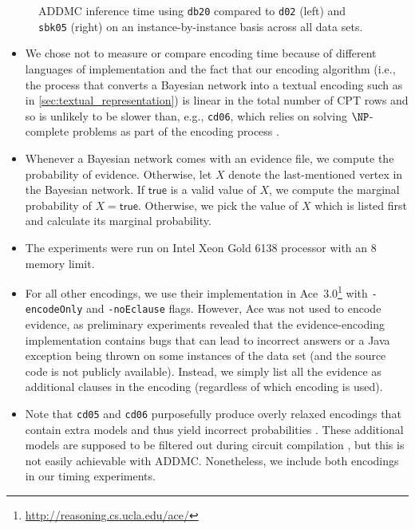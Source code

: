 \documentclass{article}
\theoremstyle{definition}
\theoremstyle{remark}
\begin{document}
{\begin{figure}
  \centering
  \caption{ADDMC inference time using \texttt{db20} compared to \texttt{d02}
    (left) and \texttt{sbk05} (right) on an instance-by-instance basis across
    all data sets.}
\end{figure}

\begin{itemize}
\item We chose not to measure or compare encoding time because of different
  languages of implementation and the fact that our encoding algorithm (i.e.,
  the process that converts a Bayesian network into a textual encoding such as
  in \cref{sec:textual_representation}) is linear in the total number of CPT
  rows and so is unlikely to be slower than, e.g., \texttt{cd06}, which relies
  on solving $\NP$-complete problems as part of the encoding process
  \cite{DBLP:conf/sat/ChaviraD06}.
\item Whenever a Bayesian network comes with an evidence file, we compute the
  probability of evidence. Otherwise, let $X$ denote the last-mentioned vertex
  in the Bayesian network. If $\mathsf{true}$ is a valid value of $X$, we
  compute the marginal probability of $X = \mathsf{true}$. Otherwise, we pick
  the value of $X$ which is listed first and calculate its marginal probability.
\item The experiments were run on Intel Xeon Gold 6138 processor with an
  \SI{8}{\giga\byte} memory limit.
\item For all other encodings, we use their implementation in
  Ace~3.0\footnote{\url{http://reasoning.cs.ucla.edu/ace/}} with
  \texttt{-encodeOnly} and \texttt{-noEclause} flags. However, Ace was not used
  to encode evidence, as preliminary experiments revealed that the
  evidence-encoding implementation contains bugs that can lead to incorrect
  answers or a Java exception being thrown on some instances of the data set
  (and the source code is not publicly available). Instead, we simply list all
  the evidence as additional clauses in the encoding (regardless of which
  encoding is used).
\item Note that \texttt{cd05} and \texttt{cd06} purposefully produce overly
  relaxed encodings that contain extra models and thus yield incorrect
  probabilities \cite{DBLP:conf/ijcai/ChaviraD05,DBLP:conf/sat/ChaviraD06}.
  These additional models are supposed to be filtered out during circuit
  compilation \cite{DBLP:conf/ijcai/ChaviraD05}, but this is not easily
  achievable with ADDMC. Nonetheless, we include both encodings in our timing
  experiments.
\end{itemize}

}
\end{document}
